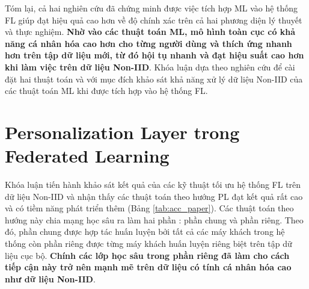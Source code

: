 Tóm lại, cả hai nghiên cứu \parencite{chen2018federated, fallah2020personalized} đã chứng minh được việc tích hợp ML vào hệ thống FL giúp đạt hiệu quả cao hơn  về độ chính xác trên cả hai phương diện lý thuyết và thực nghiệm. \textbf{Nhờ vào các thuật toán ML, mô hình toàn cục có khả năng cá nhân hóa cao hơn cho từng người dùng và thích ứng nhanh hơn trên tập dữ liệu mới, từ đó hội tụ nhanh và đạt hiệu suất cao hơn khi làm việc trên dữ liệu Non-IID}. Khóa luận dựa theo nghiên cứu \cite{chen2018federated} để cài đặt hai thuật toán  và  với mục đích khảo sát khả năng xử lý dữ liệu Non-IID của các thuật toán ML khi được tích hợp vào hệ thống FL.

\section{Personalization Layer trong Federated Learning}

Khóa luận tiến hành khảo sát kết quả của các kỹ thuật tối ưu hệ thống FL trên dữ liệu Non-IID và nhận thấy các thuật toán theo hướng PL đạt kết quả rất cao và có tiềm năng phát triển thêm (Bảng \ref{tab:acc_paper}). Các thuật toán theo hướng này chia mạng học sâu ra làm hai phần \cite{zhu2021federated}: phần chung và phần riêng. Theo đó, phần chung được hợp tác huấn luyện bởi tất cả các máy khách trong hệ thống còn phần riêng được từng máy khách huấn luyện riêng biệt trên tập dữ liệu cục bộ. \textbf{Chính các lớp học sâu trong phần riêng đã làm cho cách tiếp cận này trở nên mạnh mẽ trên dữ liệu có tính cá nhân hóa cao như dữ liệu Non-IID}.

\begin{table}
    \centering
    \caption{Độ chính xác (\%) của các hệ thống FL trên dữ liệu Non-IID của tập dữ liệu CIFAR-10 \cite{shamsian2021personalized}. Các thuật toán PL được in đậm.}
    \label{tab:acc_paper}
\end{table}

